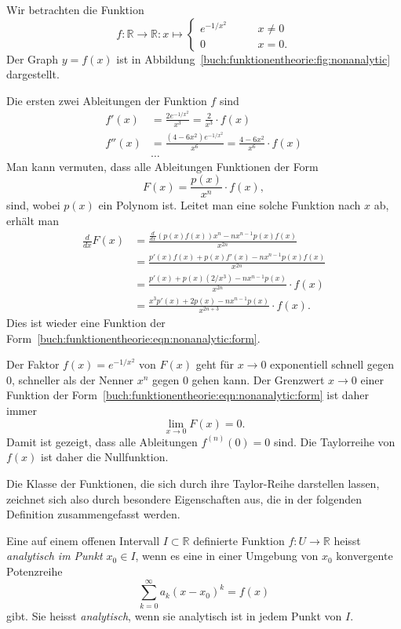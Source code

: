 \begin{beispiel}
Wir betrachten die Funktion
\[
f\colon \mathbb{R}\to\mathbb{R}
:
x \mapsto
\begin{cases}
e^{-1/x^2}&\qquad x\ne 0\\
0&\qquad x=0.
\end{cases}
\]
Der Graph $y=f(x)$ ist in Abbildung~\ref{buch:funktionentheorie:fig:nonanalytic}
dargestellt.

Die ersten zwei Ableitungen der Funktion $f$ sind
\begin{align*}
f'(x) &= \frac{2e^{-1/x^2}}{x^3} = \frac{2}{x^3}\cdot f(x)
\\
f''(x) &= \frac{(4-6x^2) e^{-1/x^2}}{x^6} = \frac{4-6x^2}{x^6}\cdot f(x)
\\
&\dots
\end{align*}
Man kann vermuten, dass alle
Ableitungen Funktionen der Form
\begin{equation}
F(x) = \frac{p(x)}{x^n} \cdot f(x),
\label{buch:funktionentheorie:eqn:nonanalytic:form}
\end{equation}
sind,
wobei $p(x)$ ein Polynom ist.
Leitet man eine solche Funktion nach $x$ ab, erhält man
\begin{align*}
\frac{d}{dx} F(x)
&=
\frac{\frac{d}{dx}(p(x)f(x)) x^n - nx^{n-1}p(x)f(x)}{x^{2n}}
\\
&=
\frac{p'(x)f(x) + p(x)f'(x) - nx^{n-1}p(x)f(x)}{x^{2n}} 
\\
&=
\frac{p'(x) + p(x)(2/x^3) - nx^{n-1}p(x)}{x^{2n}} \cdot f(x)
\\
&=
\frac{x^3p'(x)+2p(x)-nx^{n-1}p(x)}{x^{2n+3}}\cdot f(x).
\end{align*}
Dies ist wieder eine Funktion der
Form~\eqref{buch:funktionentheorie:eqn:nonanalytic:form}.

Der Faktor $f(x)=e^{-1/x^2}$ von $F(x)$ geht für $x\to 0$ exponentiell
schnell gegen $0$, schneller als der Nenner $x^n$ gegen $0$ gehen
kann. 
Der Grenzwert $x\to 0$ einer Funktion der 
Form~\eqref{buch:funktionentheorie:eqn:nonanalytic:form}
ist daher immer
\[
\lim_{x\to 0}  F(x) =0.
\]
Damit ist gezeigt, dass alle Ableitungen $f^{(n)}(0)=0$ sind.
Die Taylorreihe von $f(x)$ ist daher die Nullfunktion.
\end{beispiel}

Die Klasse der Funktionen, die sich durch ihre Taylor-Reihe darstellen
lassen, zeichnet sich also durch besondere Eigenschaften aus, die in
der folgenden Definition zusammengefasst werden.

%
%
\begin{definition}
Eine auf einem offenen Intervall $I\subset \mathbb {R}$ definierte Funktion
$f\colon U\to\mathbb{R}$ heisst {\em analytisch im Punkt  $x_0\in I$}, wenn
es eine in einer Umgebung von $x_0$ konvergente Potenzreihe
\[
\sum_{k=0}^\infty a_k(x-x_0)^k = f(x)
\]
gibt.
Sie heisst {\em analytisch}, wenn sie analytisch ist in jedem Punkt von $I$.
\end{definition}

